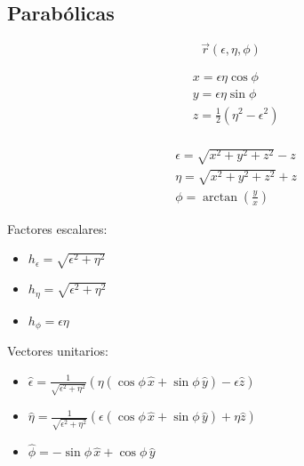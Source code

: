 \newpage
\subsection{Parabólicas}

\[\Vec{r}(\epsilon,\eta,\phi)\]

\begin{minipage}{0.55\textwidth}
\begin{equation}
\begin{split}
    &x = \epsilon\eta\cos{\phi}\\
    &y = \epsilon\eta\sin{\phi}\\
    &z = \frac{1}{2}(\eta^2-\epsilon^2)\\
\end{split}
\nonumber
\end{equation}
\end{minipage}
\begin{minipage}{0.35\textwidth}
\begin{equation}
\begin{split}
    & \epsilon = \sqrt{x^2+y^2+z^2}-z\\
    & \eta = \sqrt{x^2+y^2+z^2}+z\\
    & \phi = \arctan{\left(\frac{y}{x}\right)}
\end{split}
\nonumber
\end{equation}
\end{minipage}

\bigbreak
Factores escalares:
\begin{itemize}
    \item $h_\epsilon = \sqrt{\epsilon^2+\eta^2}$
    \item $h_\eta = \sqrt{\epsilon^2+\eta^2}$
    \item $h_\phi = \epsilon\eta$
\end{itemize}
\bigbreak
Vectores unitarios:

\begin{itemize}
    \item $\hat{\epsilon} = \frac{1}{\sqrt{\epsilon^2+\eta^2}}(\eta(\cos{\phi}\,\hat{x}+\sin{\phi}\,\hat{y})-\epsilon\hat{z})$
    \item $\hat{\eta} =  \frac{1}{\sqrt{\epsilon^2+\eta^2}}(\epsilon(\cos{\phi}\,\hat{x}+\sin{\phi}\,\hat{y})+\eta\hat{z})$
    \item $\hat{\phi} = -\sin{\phi}\,\hat{x}+\cos{\phi}\,\hat{y}$
\end{itemize}

